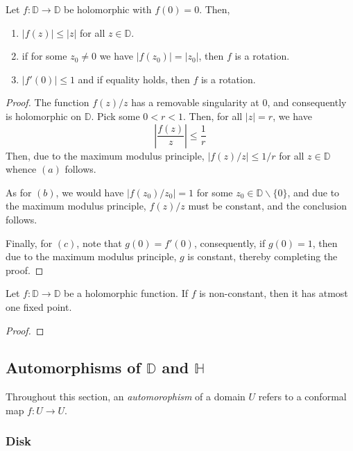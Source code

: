 \begin{lemma}[Schwarz]
    Let $f:\mathbb D\to\mathbb D$ be holomorphic with $f(0) = 0$. Then, 
    \begin{enumerate}[label=(\alph*)]
    \item $|f(z)|\le|z|$ for all $z\in\mathbb D$.
    \item if for some $z_0\ne 0$ we have $|f(z_0)| = |z_0|$, then $f$ is a rotation.
    \item $|f'(0)|\le 1$ and if equality holds, then $f$ is a rotation.
    \end{enumerate}
\end{lemma}
\begin{proof}
    The function $f(z)/z$ has a removable singularity at $0$, and consequently is holomorphic on $\mathbb D$. Pick some $0 < r < 1$. Then, for all $|z| = r$, we have 
    \begin{equation*}
        \left|\frac{f(z)}{z}\right|\le\frac{1}{r}
    \end{equation*}
    Then, due to the maximum modulus principle, $|f(z)/z|\le 1/r$ for all $z\in\mathbb D$ whence $(a)$ follows. 

    As for $(b)$, we would have $|f(z_0)/z_0| = 1$ for some $z_0\in\mathbb D\backslash\{0\}$, and due to the maximum modulus principle, $f(z)/z$ must be constant, and the conclusion follows.

    Finally, for $(c)$, note that $g(0) = f'(0)$, consequently, if $g(0) = 1$, then due to the maximum modulus principle, $g$ is constant, thereby completing the proof.
\end{proof}

\begin{proposition}
    Let $f:\mathbb D\to\mathbb D$ be a holomorphic function. If $f$ is non-constant, then it has atmost one fixed point.
\end{proposition}
\begin{proof}
    
\end{proof}

\subsection{Automorphisms of \texorpdfstring{$\mathbb D$}{} and \texorpdfstring{$\mathbb H$}{}}

Throughout this section, an \textit{automorophism} of a domain $U$ refers to a conformal map $f: U\to U$. 

\subsubsection*{Disk}


